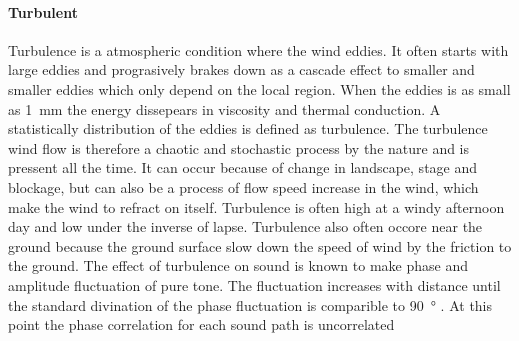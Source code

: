 \paragraph{Turbulent} Turbulence is a atmospheric condition where the wind eddies. It often starts with large eddies and prograsively brakes down as a cascade effect to smaller and smaller eddies which only depend on the local region. When the eddies is as small as \SI{1}{\milli\meter} the energy dissepears in viscosity and thermal conduction. A statistically distribution of the eddies is defined as turbulence. The turbulence wind flow is therefore a chaotic and stochastic process by the nature and is pressent all the time. It can occur because of change in landscape, stage and blockage, but can also be a process of flow speed increase in the wind, which make the wind to refract on itself. Turbulence is often high at a windy afternoon day and low under the inverse of lapse. Turbulence also often occore near the ground because the ground surface slow down the speed of wind by the friction to the ground. The effect of turbulence on sound is known to make phase and amplitude fluctuation of pure tone. The fluctuation increases with distance until the standard divination of the phase fluctuation is comparible to \SI{90}{\degree} \citep{review_of_sound}. At this point the phase correlation for each sound path is uncorrelated









